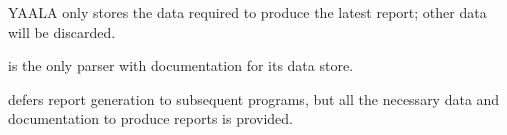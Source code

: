 \begin{table}[htb]
\begin{eqlist}
        \item [\ddag{}] YAALA only stores the data required to produce the
            latest report; other data will be discarded.

        \item [\nialpha{}] \parsername{} is the only parser with
            documentation for its data store.

        \item [\nibeta{}] \parsername{} defers report generation to
            subsequent programs, but all the necessary data and
            documentation to produce reports is provided.

    \end{eqlist}

\end{table}

